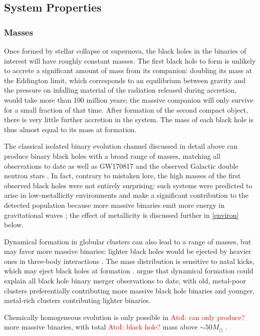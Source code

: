 \documentclass[iop,onecolumn]{revtex4}
\newcommand{\ajf}[1]{\textcolor{red}{AtoI: #1}}
\begin{document}
\subsection{System Properties}
\subsubsection{Masses}
Once formed by stellar collapse or supernova, the black holes in the binaries of interest will have roughly constant masses. The first black hole to form is unlikely to accrete a significant amount of mass from its companion: doubling its mass at the Eddington limit, which corresponds to an equilibrium between gravity and the pressure on infalling material of the radiation released during accretion, would take more than 100 million years; the massive companion will only survive for a small fraction of that time. After formation of the second compact object, there is very little further accretion in the system. The mass of each black hole is thus almost equal to its mass at formation. 

The classical isolated binary evolution channel discussed in detail above can produce binary black holes with a broad range of masses, matching all observations to date \citep[e.g.,][]{Stevenson:2017} as well as GW170817 and the observed Galactic double neutron stars \citep[e.g.,][]{Kruckow:2018,VignaGomez:2018}.  In fact, contrary to mistaken lore, the high masses of the first observed black holes were not entirely surprising: such systems were predicted to arise in low-metallicity environments and make a significant contribution to the detected population because more massive binaries emit more energy in gravitational waves \citep{Dominik:2014}; the effect of metallicity is discussed further in \autoref{environ} below. 

 Dynamical formation in globular clusters can also lead to a range of masses, but may favor more massive binaries: lighter black holes would be ejected by heavier ones in three-body interactions \citep{Rodriguez:2015}. The mass distribution is sensitive to natal kicks, which may eject black holes at formation \citep{Zevin:2017}.  \citet{Chatterjee:2017} argue that dynamical formation could explain all black hole binary merger observations to date, with old, metal-poor clusters preferentially contributing more massive black hole binaries and younger, metal-rich clusters contributing lighter binaries.
 
  Chemically homogeneous evolution is only possible in \ajf{can only produce?} more massive binaries, with total \ajf{black hole?} mass above $\sim 50 M_\odot$ \citep{MandeldeMink:2016,Marchant:2016}.
\end{document}
